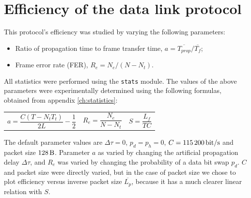 \documentclass[a4paper, 11pt]{report}
\begin{document}
\section{Efficiency of the data link protocol} \label{sec:Efficiency}

This protocol's efficiency was studied by varying the following parameters:
\begin{itemize}
	\itemsep0em
	\item Ratio of propagation time to frame transfer time, $a = \overline{T_{prop}}/\overline{T_f}$;
	\item Frame error rate (FER), $R_e = N_e/(N-N_t)$.
\end{itemize}

All statistics were performed using the \texttt{stats} module. The values of the above parameters were experimentally determined using the following formulas, obtained from appendix \ref{ch:statistics}:
\begin{center}
	\vspace{-10pt}
	\begin{tabular}{c c c}
		\begin{minipage}{40mm}\begin{equation*}
			a = \frac{C(T - N_t T_t)}{2 L} - \frac{1}{2}
		\end{equation*}\end{minipage} &
		\begin{minipage}{25mm}\begin{equation*}
			R_e = \frac{N_e}{N-N_t}
		\end{equation*}\end{minipage} &
		\begin{minipage}{25mm}\begin{equation*}
			S = \frac{L_f}{T C}
		\end{equation*}\end{minipage}
	\end{tabular}
\end{center}

The default parameter values are $\Delta \tau = 0$, $p_d=p_h=0$, $C=\SI{115200}{\bit/\second}$ and packet size $\SI{128}{\byte}$.
Parameter $a$ as varied by changing the artificial propagation delay $\Delta \tau$, and $R_e$ was varied by changing the probability of a data bit swap $p_d$.
$C$ and packet size were directly varied, but in the case of packet size we chose to plot efficiency versus inverse packet size $\overline{L_p}$, because it has a much clearer linear relation with $S$.
\end{document}
